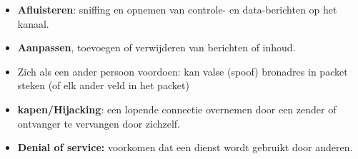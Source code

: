 \begin{itemize}
    \item \textbf{Afluisteren}: sniffing en opnemen van controle- en data-berichten op het kanaal.
    \item \textbf{Aanpassen}, toevoegen of verwijderen van berichten of inhoud. 
    \item Zich als een ander persoon voordoen: kan valse (spoof) bronadres in packet steken (of elk ander veld in het packet)
    \item \textbf{kapen/Hijacking}: een lopende connectie overnemen door een zender of ontvanger te vervangen door zichzelf.
    \item \textbf{Denial of service:} voorkomen dat een dienst wordt gebruikt door anderen.
\end{itemize}